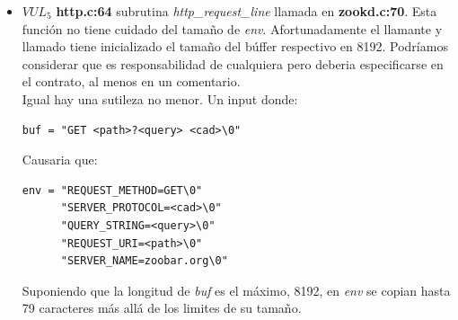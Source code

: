 \documentclass[12pt]{article}
\begin{document}
\begin{itemize}
\item  $VUL_5$ \textbf{ \lbrack http.c:64\rbrack } subrutina \textit{http\_request\_line} llamada en \textbf{ \lbrack zookd.c:70\rbrack }. Esta función no tiene cuidado del tamaño de \textit{env}. Afortunadamente el llamante y llamado tiene inicializado el tamaño del búffer respectivo en 8192. Podríamos considerar que es responsabilidad de cualquiera pero deberia especificarse en el contrato, al menos en un comentario. \\
Igual hay una sutileza no menor. Un input donde:
\begin{lstlisting}
buf = "GET <path>?<query> <cad>\0"
\end{lstlisting}
Causaria que:
\begin{lstlisting}
env = "REQUEST_METHOD=GET\0"
      "SERVER_PROTOCOL=<cad>\0"
      "QUERY_STRING=<query>\0"
      "REQUEST_URI=<path>\0" 
      "SERVER_NAME=zoobar.org\0" 
\end{lstlisting}
Suponiendo que la longitud de \textit{buf} es el máximo, 8192, en \textit{env} se copian hasta 79 caracteres más allá de los limites de su tamaño.
\end{itemize}
\end{document}
